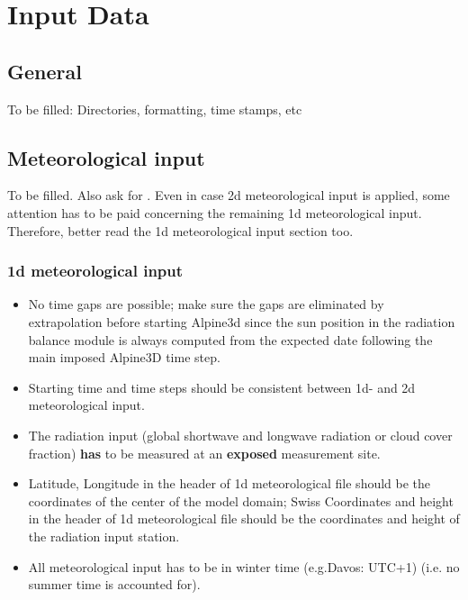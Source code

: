 \documentclass[12pt]{report}
\begin{document}
\chapter{Input Data}\label{ch:input}

\section{General}
To be filled: Directories, formatting, time stamps, etc

\section{Meteorological input}
To be filled. Also ask for \cite{jon07}.
Even in case 2d meteorological input is applied, some attention has to be paid concerning the remaining 1d meteorological input. Therefore, better read the 1d meteorological input section too.
\subsection{1d meteorological input}
\begin{itemize}
\item No time gaps are possible; make sure the gaps are eliminated by extrapolation before starting Alpine3d since the sun position in the radiation balance module is always computed from the expected date following the main imposed Alpine3D time step.
\item Starting time and time steps should be consistent between 1d- and 2d meteorological input.
\item The radiation input (global shortwave and longwave radiation or cloud cover fraction) \textbf{has} to be measured at an \textbf{exposed} measurement site.
\item Latitude, Longitude in the header of 1d meteorological file should be the coordinates of the center of the model domain; Swiss Coordinates and height in the header of 1d meteorological file should be the coordinates and height of the radiation input station.
\item All meteorological input has to be in winter time (e.g.Davos: UTC+1) (i.e. no summer time is accounted for).
\end{itemize}
\end{document}
